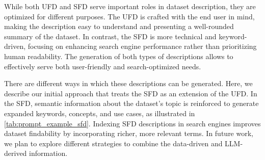 While both UFD and SFD serve important roles in dataset description, they are optimized for different purposes. The UFD is crafted with the end user in mind, making the description easy to understand and presenting a well-rounded summary of the dataset. In contrast, the SFD is more technical and keyword-driven, focusing on enhancing search engine performance rather than prioritizing human readability.
% 
The generation of both types of descriptions allows \SystemName to effectively serve both user-friendly and search-optimized needs.

There are different ways in which these descriptions can be generated. Here, we describe our initial approach that treats the SFD as an extension of the UFD.
%
In the SFD, semantic information about the dataset’s topic is reinforced to generate expanded keywords, concepts, and use cases, as illustrated in \autoref{tab:prompt_example_sfd}.
%
Indexing SFD descriptions in search engines improves dataset findability by incorporating richer, more relevant terms.
% 
In future work, we plan to explore different strategies to combine the data-driven and LLM-derived information.

